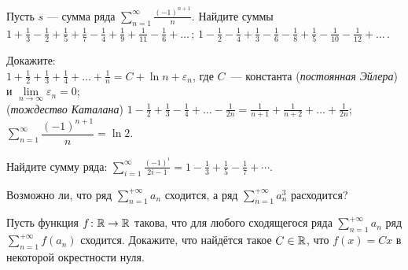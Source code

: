 \documentclass[a4paper, 12pt]{article}
\begin{document}
Пусть $s$ --- сумма ряда
$\sum\limits_{n=1}^\infty \frac{(-1)^{n+1}}{n}$. %
Найдите суммы
\\
$1+\frac13-\frac12+\frac15+\frac17-\frac14+\frac19+\frac1{11}-\frac16+\ldots$\,;
$1-\frac12-\frac14+\frac13-\frac16-\frac18+\frac15-\frac1{10}-\frac1{12}+\ldots$\,.


Докажите:
\\
$1+\frac12+\frac13+\frac14+\dots+\frac1n=C+\ln n+\varepsilon_n$,
где $C$~--- константа ({\em постоянная Эйлера}) и $\lim\limits_{n\to\infty}\varepsilon_n=0$;
\\
({\em тождество Каталана})
$1-\frac12+\frac13-\frac14+\ldots-\frac1{2n}=
\frac1{n+1}+\frac1{n+2}+\ldots+\frac1{2n}$;
\\
$\displaystyle\sum\limits_{n=1}^\infty \dfrac{(-1)^{n+1}}{n}=\ln 2$.



Найдите сумму ряда: $\displaystyle\sum_{i=1}^{\infty} \frac{(-1)^i}{2i-1} = 1 - \frac{1}{3}+\frac{1}{5}-\frac{1}{7} + \cdots$.


Возможно ли, что
ряд $\sum\limits_{n=1}^{+\infty} a_n$ сходится, а ряд
$\sum\limits_{n=1}^{+\infty} a_n^3$ расходится?



%
Пусть функция $f\colon\mathbb{R}\rightarrow\mathbb{R}$ такова, что для любого сходящегося
ряда $\sum\limits_{n=1}^{+\infty} a_n$ ряд $\sum\limits_{n=1}^{+\infty} f(a_n)$ сходится. Докажите, что найдётся
такое $C\in\mathbb{R}$, что $f(x)=Cx$ в некоторой окрестности нуля.

\end{document}
